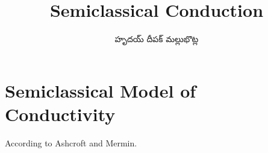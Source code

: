 \documentclass[../main.tex]{subfiles}
\title{Semiclassical Conduction}
\author{\begin{telugu}హృదయ్ దీపక్ మల్లుభొట్ల\end{telugu}}
\date{}
\begin{document}
	\onlyinsubfile{\maketitle}
	\section{Semiclassical Model of Conductivity} \label{sec:SemiclassicalConductivity}

	According to Ashcroft and Mermin\cite{Ashcroft}.
\end{document}
